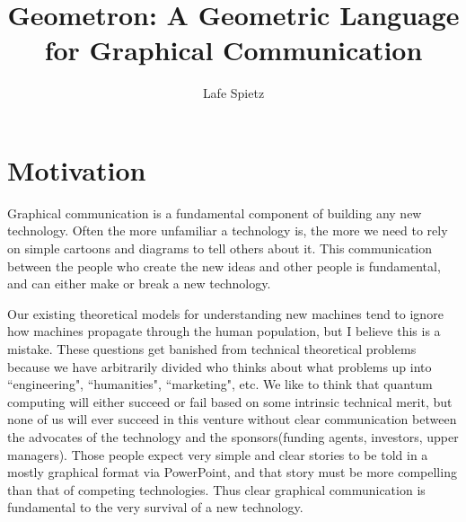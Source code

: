 \documentclass[11pt]{article}
\begin{document}
\title{Geometron: A Geometric Language for Graphical Communication}
\author{Lafe Spietz}


\section{Motivation}

    Graphical communication is a fundamental component of building any new technology.  Often the more unfamiliar a technology is, the more we need to rely on simple cartoons and diagrams to tell others about it.  This communication between the people who create the new ideas and other people is fundamental, and can either make or break a new technology.   

    Our existing theoretical models for understanding new machines tend to ignore how machines propagate through the human population, but I believe this is a mistake.  These questions get banished from technical theoretical problems because we have arbitrarily divided who thinks about what problems up into ``engineering", ``humanities", ``marketing", etc.  We like to think that quantum computing will either succeed or fail based on some intrinsic technical merit, but none of us will ever succeed in this venture without clear communication between the advocates of the technology and the sponsors(funding agents, investors, upper managers).  Those people expect very simple and clear stories to be told in a mostly graphical format via PowerPoint, and that story must be more compelling than that of competing technologies.  Thus clear graphical communication is fundamental to the very survival of a new technology.  
\end{document}
